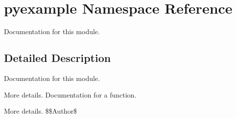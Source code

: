 \hypertarget{namespacepyexample}{}\section{pyexample Namespace Reference}
\label{namespacepyexample}


Documentation for this module.  




\subsection{Detailed Description}
Documentation for this module. 

More details. Documentation for a function.

More details. \$\$\+Author\$ 